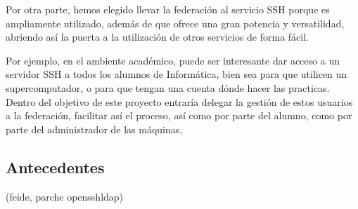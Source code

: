 Por otra parte, hemos elegido llevar la federación al servicio SSH
porque es ampliamente utilizado, además de que ofrece una gran
potencia y versatilidad, abriendo así la puerta a la utilización de
otros servicios de forma fácil.

Por ejemplo, en el ambiente académico, puede ser interesante dar
acceso a un servidor SSH a todos los alumnos de Informática, bien sea
para que utilicen un supercomputador, o para que tengan una cuenta
dónde hacer las practicas. Dentro del objetivo de este proyecto
entraría delegar la gestión de estos usuarios a la federación,
facilitar así el proceso, así como por parte del alumno, como por
parte del administrador de las máquinas.

\subsection{Antecedentes}
    (feide, parche opensshldap)


